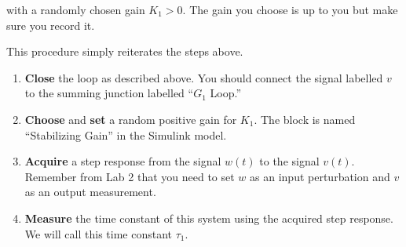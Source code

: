 \begin{center}
\end{center}
%
with a randomly chosen gain \(K_1 > 0.\)
The gain you choose is up to you but make sure you record it.
\begin{procedure}[label={proc:lab3:stabilize}]
  This procedure simply reiterates the steps above.
  \begin{enumerate}[label={(\arabic*)}]
    \item{%
      \textbf{Close} the loop as described above.
      You should connect the signal labelled \(v\) to the summing junction labelled ``\(G_1\) Loop.''%
    }
    \item{%
      \textbf{Choose} and \textbf{set} a random positive gain for \(K_1.\)
      The block is named ``Stabilizing Gain'' in the Simulink model.%
    }
    \item{%
      \textbf{Acquire} a step response from the signal \(w(t)\) to the signal \(v(t).\)
      Remember from Lab 2 that you need to set \(w\) as an input perturbation and \(v\) as an output measurement.
    }
    \item{%
      \textbf{Measure} the time constant of this system using the acquired step response. We will call this time constant \(\tau_1.\)
    }
  \end{enumerate}
\end{procedure}

